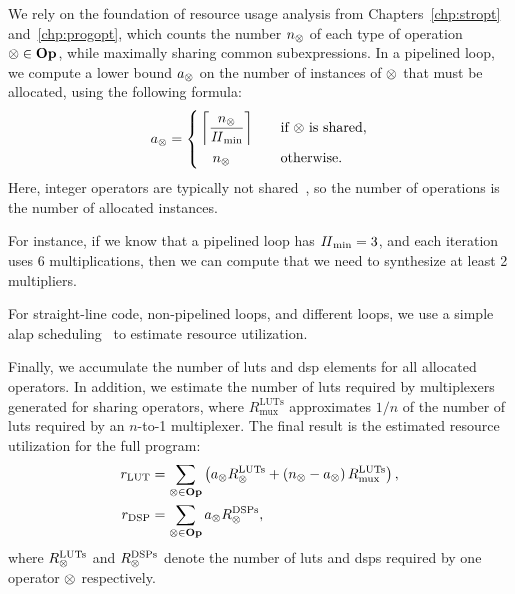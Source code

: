 We rely on the foundation of resource usage analysis from
Chapters~\ref{chp:stropt} and~\ref{chp:progopt}, which counts the number
$n_\otimes$ of each type of operation $\otimes \in \mathbf{Op}$, while maximally
sharing common subexpressions.  In a pipelined loop, we compute a lower bound
$a_\otimes$ on the number of instances of $\otimes$ that must be allocated,
using the following formula:
\begin{equation}
    a_\otimes = \left\{
        \begin{aligned}
            & \left\lceil \frac{n_\otimes}{\mathit{II}_{\rm min}} \right\rceil
            && \quad \text{if $\otimes$ is shared}, \\
            & \quad n_\otimes
            && \quad \text{otherwise}.
        \end{aligned}
    \right.
\end{equation}
Here, integer operators are typically not shared~\cite{cong15}, so the number
of operations is the number of allocated instances.

For instance, if we know that a pipelined loop has $\mathit{II}_{\rm min} = 3$, and each
iteration uses 6 multiplications, then we can compute that we need to
synthesize at least 2 multipliers.

For straight-line code, non-pipelined loops, and different loops, we use a
simple \gls{alap} scheduling~\cite{wang_hls} to estimate resource utilization.

Finally, we accumulate the number of \glspl{lut} and \gls{dsp} elements
for all allocated operators.  In addition, we estimate the number of
\glspl{lut} required by multiplexers generated for sharing operators, where
$R^\mathrm{LUTs}_\mathrm{mux}$ approximates $1/n$ of the number of \glspl{lut}
required by an $n$-to-1 multiplexer.  The final result is the estimated
resource utilization for the full program:
\begin{equation}
    \begin{aligned}
        r_\mathrm{LUT} &=
            \sum_{\otimes \in \mathbf{Op}} \left(
                a_\otimes R^\mathrm{LUTs}_\otimes +
                \left( n_\otimes - a_\otimes \right)
                    R^\mathrm{LUTs}_\mathrm{mux}
            \right), \\
        r_\mathrm{DSP} &=
            \sum_{\otimes \in \mathbf{Op}} a_\otimes R^\mathrm{DSPs}_\otimes,
    \end{aligned}
\end{equation}
where $R^\mathrm{LUTs}_\otimes$ and $R^\mathrm{DSPs}_\otimes$ denote the
number of \glspl{lut} and \glspl{dsp} required by one operator $\otimes$
respectively.


